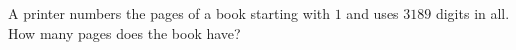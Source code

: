 A printer numbers the pages of a book starting with $1$ and uses $3189$ digits in all. How many pages does the book have?
